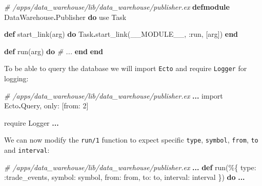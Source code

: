 \documentclass[
]{book}
\newenvironment{Shaded}{\begin{snugshade}}{\end{snugshade}}
\newcommand{\CommentTok}[1]{\textcolor[rgb]{0.56,0.35,0.01}{\textit{#1}}}
\newcommand{\ConstantTok}[1]{\textcolor[rgb]{0.00,0.00,0.00}{#1}}
\newcommand{\DecValTok}[1]{\textcolor[rgb]{0.00,0.00,0.81}{#1}}
\newcommand{\ImportTok}[1]{#1}
\newcommand{\KeywordTok}[1]{\textcolor[rgb]{0.13,0.29,0.53}{\textbf{#1}}}
\newcommand{\NormalTok}[1]{#1}
\newcommand{\OperatorTok}[1]{\textcolor[rgb]{0.81,0.36,0.00}{\textbf{#1}}}
\newcommand{\VariableTok}[1]{\textcolor[rgb]{0.00,0.00,0.00}{#1}}
\begin{document}
\begin{Shaded}
\begin{Highlighting}[]
\CommentTok{\# /apps/data\_warehouse/lib/data\_warehouse/publisher.ex}
\KeywordTok{defmodule} \ConstantTok{DataWarehouse}\OperatorTok{.}\ConstantTok{Publisher} \KeywordTok{do}
  \ImportTok{use} \ConstantTok{Task}

  \KeywordTok{def}\NormalTok{ start\_link(arg) }\KeywordTok{do}
    \ConstantTok{Task}\OperatorTok{.}\NormalTok{start\_link(}\ConstantTok{\_\_MODULE\_\_}\NormalTok{, }\VariableTok{:run}\NormalTok{, [arg])}
  \KeywordTok{end}

  \KeywordTok{def}\NormalTok{ run(arg) }\KeywordTok{do}
    \CommentTok{\# ...}
  \KeywordTok{end}
\KeywordTok{end}
\end{Highlighting}
\end{Shaded}

To be able to query the database we will import \texttt{Ecto} and require \texttt{Logger} for logging:

\begin{Shaded}
\begin{Highlighting}[]
  \CommentTok{\# /apps/data\_warehouse/lib/data\_warehouse/publisher.ex}
  \OperatorTok{...}
  \ImportTok{import} \ConstantTok{Ecto}\OperatorTok{.}\ConstantTok{Query}\NormalTok{, }\VariableTok{only:}\NormalTok{ [}\VariableTok{from:} \DecValTok{2}\NormalTok{]}

  \ImportTok{require} \ConstantTok{Logger}
  \OperatorTok{...}
\end{Highlighting}
\end{Shaded}

We can now modify the \texttt{run/1} function to expect specific \texttt{type}, \texttt{symbol}, \texttt{from}, \texttt{to} and \texttt{interval}:

\begin{Shaded}
\begin{Highlighting}[]
  \CommentTok{\# /apps/data\_warehouse/lib/data\_warehouse/publisher.ex  }
  \OperatorTok{...}
  \KeywordTok{def}\NormalTok{ run(\%\{}
        \VariableTok{type:} \VariableTok{:trade\_events}\NormalTok{,}
        \VariableTok{symbol:}\NormalTok{ symbol,}
        \VariableTok{from:}\NormalTok{ from,}
        \VariableTok{to:}\NormalTok{ to,}
        \VariableTok{interval:}\NormalTok{ interval}
\NormalTok{      \}) }\KeywordTok{do}
    \OperatorTok{...}  
\end{Highlighting}
\end{Shaded}
\end{document}
